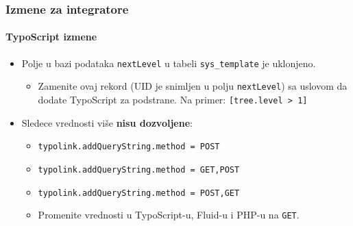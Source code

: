 
\begin{frame}[fragile]
	\frametitle{Izmene za integratore}
	\framesubtitle{TypoScript izmene}

	\begin{itemize}
		\item Polje u bazi podataka \texttt{nextLevel} u tabeli
			\texttt{sys\_template} je uklonjeno.

			\begin{itemize}\smaller
				\item[\ding{228}] Zamenite ovaj rekord (UID je snimljen u polju \texttt{nextLevel}) sa uslovom da dodate TypoScript za podstrane. Na primer: \texttt{[tree.level > 1]}
			\end{itemize}\normalsize

		\item Sledece vrednosti više \textbf{nisu dozvoljene}:

			\begin{itemize}\smaller
				\item \texttt{typolink.addQueryString.method = POST}
				\item \texttt{typolink.addQueryString.method = GET,POST}
				\item \texttt{typolink.addQueryString.method = POST,GET}
			\end{itemize}\normalsize

			\begin{itemize}\smaller
				\item[\ding{228}] Promenite vrednosti u TypoScript-u, Fluid-u i PHP-u na \texttt{GET}.
			\end{itemize}\normalsize

	\end{itemize}

\end{frame}


